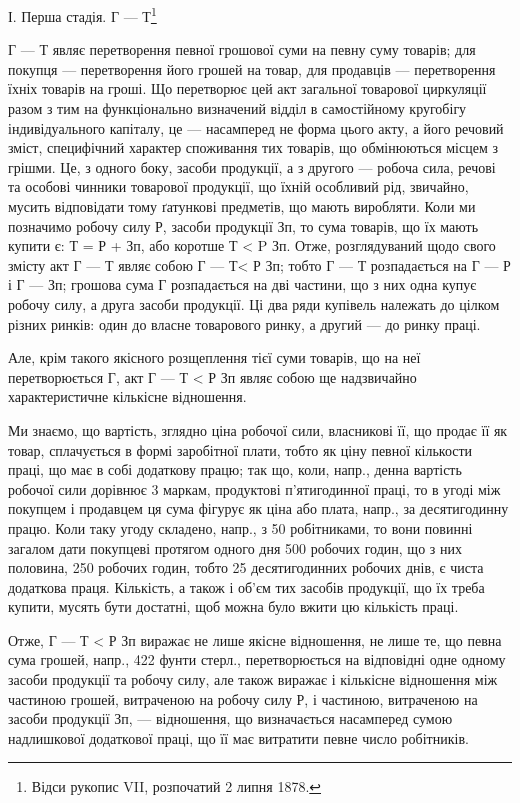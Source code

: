 І. Перша стадія. Г — Т\footnote{
Відси рукопис VII, розпочатий 2 липня 1878.
}

Г — Т являє перетворення певної грошової суми на певну суму товарів; для покупця — перетворення його
грошей на товар, для продавців — перетворення їхніх товарів на гроші. Що перетворює цей акт
загальної товарової циркуляції разом з тим на функціонально визначений відділ в самостійному
кругобігу індивідуального капіталу, це — насамперед не форма цього акту, а його речовий зміст,
специфічний характер
споживання тих товарів, що обмінюються місцем з грішми. Це, з одного боку, засоби продукції, а з
другого — робоча сила, речові та особові чинники товарової продукції, що їхній особливий рід,
звичайно, мусить відповідати тому ґатункові предметів, що мають виробляти. Коли ми позначимо робочу
силу Р, засоби продукції Зп, то сума товарів, що їх мають купити є: Т = Р + Зп, або коротше Т <  P
Зп. Отже, розглядуваний щодо свого змісту акт Г — Т являє собою Г — Т< Р Зп; тобто Г — Т
розпадається на Г — Р і Г — Зп; грошова сума Г розпадається на дві частини, що з них одна купує
робочу силу, а друга засоби продукції. Ці два ряди купівель належать до цілком різних ринків: один
до власне товарового ринку, а другий — до ринку праці.

Але, крім такого якісного розщеплення тієї суми товарів, що на неї перетворюється Г, акт Г — Т  < Р
Зп являє собою ще надзвичайно характеристичне кількісне відношення.

Ми знаємо, що вартість, зглядно ціна робочої сили, власникові її, що продає її як товар, сплачується
в формі заробітної плати, тобто як ціну певної кількости праці, що має в собі додаткову працю; так
що, коли, напр., денна вартість робочої сили дорівнює 3 маркам, продуктові п’ятигодинної праці, то в
угоді між покупцем і продавцем ця сума фігурує як ціна або плата, напр., за десятигодинну працю.
Коли таку угоду складено, напр., з 50 робітниками, то вони повинні загалом дати покупцеві протягом
одного дня 500 робочих годин, що з них половина, 250 робочих годин, тобто 25 десятигодинних робочих
днів, є чиста додаткова праця. Кількість, а також і об’єм тих засобів продукції,
що їх треба купити, мусять бути достатні, щоб можна було вжити цю кількість праці.

Отже, Г — Т < Р Зп виражає не лише якісне відношення, не лише те, що певна сума грошей, напр., 422
фунти стерл., перетворюється на відповідні одне одному засоби продукції та робочу силу, але також
виражає
і кількісне відношення між частиною грошей, витраченою на робочу
силу Р, і частиною, витраченою на засоби продукції Зп, — відношення,
що визначається насамперед сумою надлишкової додаткової праці,
що її має витратити певне число робітників.

